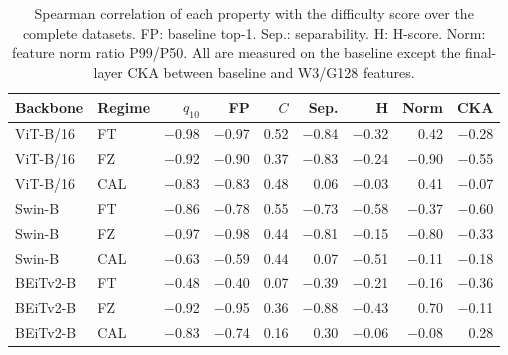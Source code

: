 \begin{table}[h]
\centering
\caption{Spearman correlation of each property with the difficulty score over the {} complete datasets. FP: baseline top-1. Sep.: separability. H: H-score. Norm: feature norm ratio P99/P50. All are measured on the baseline except the final-layer CKA between baseline and W3/G128 features.}
\label{tab:properties}
\setlength{\tabcolsep}{1.5pt}
\footnotesize
\begin{tabular}{llrrrrrrr}
\toprule
Backbone & Regime & $q_{10}$ & FP & $C$ & Sep. & H & Norm & CKA \\
\midrule
ViT-B/16 & FT & $-$0.98 & $-$0.97 & 0.52 & $-$0.84 & $-$0.32 & 0.42 & $-$0.28 \\
ViT-B/16 & FZ & $-$0.92 & $-$0.90 & 0.37 & $-$0.83 & $-$0.24 & $-$0.90 & $-$0.55 \\
ViT-B/16 & CAL & $-$0.83 & $-$0.83 & 0.48 & 0.06 & $-$0.03 & 0.41 & $-$0.07 \\
Swin-B & FT & $-$0.86 & $-$0.78 & 0.55 & $-$0.73 & $-$0.58 & $-$0.37 & $-$0.60 \\
Swin-B & FZ & $-$0.97 & $-$0.98 & 0.44 & $-$0.81 & $-$0.15 & $-$0.80 & $-$0.33 \\
Swin-B & CAL & $-$0.63 & $-$0.59 & 0.44 & 0.07 & $-$0.51 & $-$0.11 & $-$0.18 \\
BEiTv2-B & FT & $-$0.48 & $-$0.40 & 0.07 & $-$0.39 & $-$0.21 & $-$0.16 & $-$0.36 \\
BEiTv2-B & FZ & $-$0.92 & $-$0.95 & 0.36 & $-$0.88 & $-$0.43 & 0.70 & $-$0.11 \\
BEiTv2-B & CAL & $-$0.83 & $-$0.74 & 0.16 & 0.30 & $-$0.06 & $-$0.08 & 0.28 \\
\bottomrule
\end{tabular}
\end{table}

